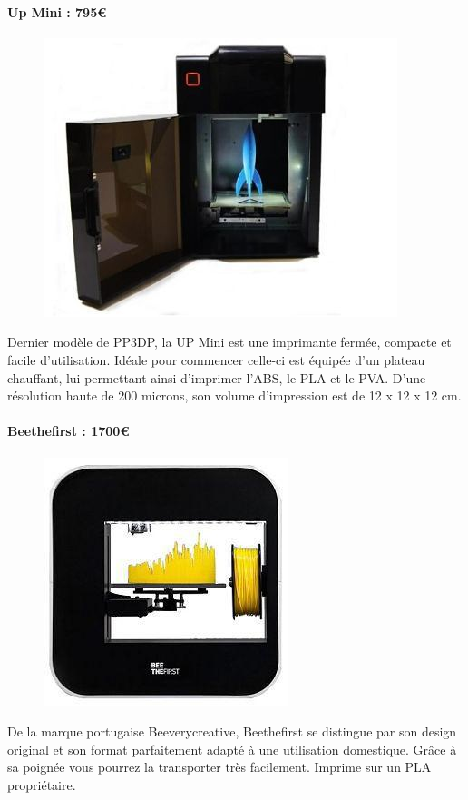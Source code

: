 \documentclass{article}
\begin{document}
\paragraph{Up Mini : 795\euro{}} \hfill \break
\begin{figure}[h!]
\centering
\includegraphics[scale=0.4]{./images/up-mini.png}
\end{figure}\hfill \break
Dernier modèle de PP3DP, la UP Mini est une imprimante fermée, compacte et facile d'utilisation. Idéale pour commencer celle-ci est équipée d'un plateau chauffant, lui permettant ainsi d'imprimer l'ABS, le PLA et le PVA. D'une résolution haute de 200 microns, son volume d'impression est de 12 x 12 x 12 cm.
\newpage
\paragraph{Beethefirst : 1700\euro{}} \hfill \break
\begin{figure}[h!]
\centering
\includegraphics[scale=0.4]{./images/Beethefirst.jpg}
\end{figure}\hfill \break
De la marque portugaise Beeverycreative, Beethefirst se distingue par son design original et son format parfaitement adapté à une utilisation domestique. Grâce à sa poignée vous pourrez la transporter très facilement. Imprime sur un PLA propriétaire.
\end{document}
